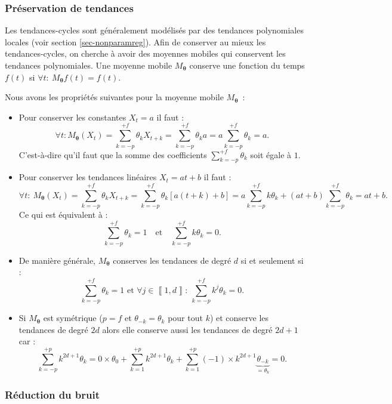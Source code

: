 \documentclass[
  12pt,
  a4paper,french]{article}
\newcommand\1{\mathds{1}}
\begin{document}
\hypertarget{pruxe9servation-de-tendances}{%
\subsubsection{Préservation de tendances}\label{pruxe9servation-de-tendances}}

Les tendances-cycles sont généralement modélisés par des tendances polynomiales locales (voir section \ref{sec-nonparamreg}).
Afin de conserver au mieux les tendances-cycles, on cherche à avoir des moyennes mobiles qui conservent les tendances polynomiales.
Une moyenne mobile \(M_{\boldsymbol\theta}\) conserve une fonction du temps \(f(t)\) si \(\forall t:\:M_{\boldsymbol\theta} f(t)=f(t)\).

Nous avons les propriétés suivantes pour la moyenne mobile \(M_{\boldsymbol\theta}\)~:

\begin{itemize}
\item
  Pour conserver les constantes \(X_t=a\) il faut :
  \[
  \forall t:M_{\boldsymbol\theta}(X_t)=\sum_{k=-p}^{+f}\theta_kX_{t+k}=\sum_{k=-p}^{+f}\theta_ka=a\sum_{k=-p}^{+f}\theta_k=a.
  \]
  C'est-à-dire qu'il faut que la somme des coefficients \(\sum_{k=-p}^{+f}\theta_k\) soit égale à \(1\).
\item
  Pour conserver les tendances linéaires \(X_t=at+b\) il faut :
  \[
  \forall t:\:M_{\boldsymbol\theta}(X_t)=\sum_{k=-p}^{+f}\theta_kX_{t+k}=\sum_{k=-p}^{+f}\theta_k[a(t+k)+b]=a\sum_{k=-p}^{+f}k\theta_k+(at+b)\sum_{k=-p}^{+f}\theta_k=at+b.
  \]
  Ce qui est équivalent à :
  \[
  \sum_{k=-p}^{+f}\theta_k=1
  \quad\text{et}\quad
  \sum_{k=-p}^{+f}k\theta_k=0.
  \]
\item
  De manière générale, \(M_{\boldsymbol\theta}\) conserves les tendances de degré \(d\) si et seulement si :
  \[
  \sum_{k=-p}^{+f}\theta_k=1
   \text{ et }
  \forall j \in \left\llbracket 1,d\right\rrbracket:\:
  \sum_{k=-p}^{+f}k^j\theta_k=0.
  \]
\item
  Si \(M_{\boldsymbol\theta}\) est symétrique (\(p=f\) et \(\theta_{-k} = \theta_k\) pour tout \(k\)) et conserve les tendances de degré \(2d\) alors elle conserve aussi les tendances de degré \(2d+1\) car :
  \[
  \sum_{k=-p}^{+p}k^{2d+1}\theta_k= 0\times\theta_0+ \sum_{k=1}^{+p}k^{2d+1}\theta_k +\sum_{k=1}^{+p}(-1)\times k^{2d+1}\underbrace{\theta_{-k}}_{=\theta_k}=0.
  \]
\end{itemize}

\hypertarget{ruxe9duction-du-bruit}{%
\subsubsection{Réduction du bruit}\label{ruxe9duction-du-bruit}}
\end{document}
